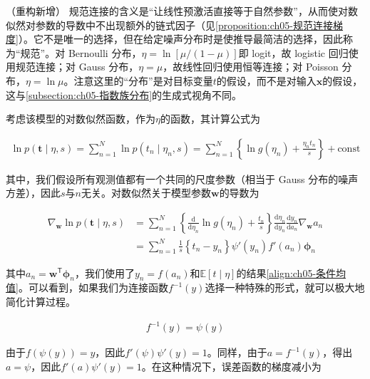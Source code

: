 \documentclass[../../main.tex]{subfiles}
\begin{document}
\begin{remark}（重构新增）
规范连接的含义是“让线性预激活直接等于自然参数”，从而使对数似然对参数的导数中不出现额外的链式因子（见\cref{proposition:ch05-规范连接梯度}）。它不是唯一的选择，但在给定噪声分布时是使推导最简洁的选择，因此称为“规范”。对 Bernoulli 分布，$\eta=\ln[\mu/(1-\mu)]$即 logit，故 logistic 回归使用规范连接；对 Gauss 分布，$\eta=\mu$，故线性回归使用恒等连接；对 Poisson 分布，$\eta=\ln\mu$。注意这里的“分布”是对目标变量$t$的假设，而不是对输入$\boldsymbol{x}$的假设，这与\cref{subsection:ch05-指数族分布}的生成式视角不同。
\end{remark}

考虑该模型的对数似然函数，作为$\eta$的函数，其计算公式为

\begin{align}
  \ln p(\boldsymbol{t}\mid\eta,s)=\sum_{n=1}^{N}\ln p(t_n\mid\eta_n,s)=\sum_{n=1}^{N}\left\{\ln g(\eta_n)+\frac{\eta_nt_n}{s}\right\}+\text{const}
  \label{align:ch05-对数似然}
\end{align}

其中，我们假设所有观测值都有一个共同的尺度参数（相当于 Gauss 分布的噪声方差），因此$s$与$n$无关。对数似然关于模型参数$\boldsymbol{w}$的导数为

\begin{align}
  \nabla_{\boldsymbol{w}}\ln p(\boldsymbol{t}\mid\eta,s)&=\sum_{n=1}^{N}\left\{\frac{\mathrm{d}}{\mathrm{d}\eta_n}\ln g(\eta_n)+\frac{t_n}{s}\right\}\frac{\mathrm{d}\eta_n}{\mathrm{d}y_n}\frac{\mathrm{d}y_n}{\mathrm{d}a_n}\nabla_{\boldsymbol{w}}a_n\nonumber\\
  &=\sum_{n=1}^{N}\frac{1}{s}\left\{t_n-y_n\right\}\psi'(y_n)f'(a_n)\boldsymbol{\phi}_n
  \label{align:ch05-梯度链式}
\end{align}

其中$a_n=\boldsymbol{w}^{\mathsf{T}}\boldsymbol{\phi}_n$，我们使用了$y_n=f(a_n)$和$\mathbb{E}[t\mid\eta]$的结果\eqref{align:ch05-条件均值}。可以看到，如果我们为连接函数$f^{-1}(y)$选择一种特殊的形式，就可以极大地简化计算过程。

\begin{align}
  f^{-1}(y)=\psi(y)
  \label{align:ch05-规范连接条件}
\end{align}

由于$f(\psi(y))=y$，因此$f'(\psi)\psi'(y)=1$。同样，由于$a=f^{-1}(y)$，得出$a=\psi$，因此$f'(a)\psi'(y)=1$。在这种情况下，误差函数的梯度减小为
\end{document}
